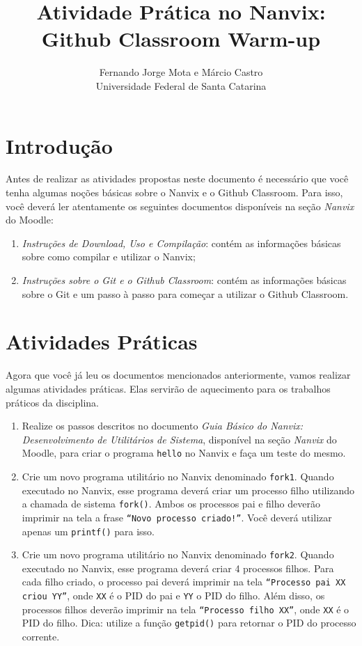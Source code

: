 \documentclass[11pt]{article}
\title{Atividade Prática no Nanvix: Github Classroom Warm-up}
\author{Fernando Jorge Mota e Márcio Castro\\[0.3em]
\small Universidade Federal de Santa Catarina}
\date{}
\begin{document}
\maketitle

\section{Introdução}

Antes de realizar as atividades propostas neste documento é necessário que você tenha algumas noções básicas sobre o Nanvix e o Github Classroom. Para isso, você deverá ler atentamente os seguintes documentos disponíveis na seção \textit{Nanvix} do Moodle:

\begin{enumerate}
	\item \textit{Instruções de Download, Uso e Compilação}: contém as informações básicas sobre como compilar e utilizar o Nanvix;
	\item \textit{Instruções sobre o Git e o Github Classroom}: contém as informações básicas sobre o Git e um passo à passo para começar a utilizar o Github Classroom.
\end{enumerate}

\section{Atividades Práticas}

Agora que você já leu os documentos mencionados anteriormente, vamos realizar algumas atividades práticas. Elas servirão de aquecimento para os trabalhos práticos da disciplina.

\begin{enumerate}
	\item Realize os passos descritos no documento \textit{Guia Básico do Nanvix: Desenvolvimento de Utilitários de Sistema}, disponível na seção \textit{Nanvix} do Moodle, para criar o programa \texttt{hello} no Nanvix e faça um teste do mesmo.
	\item Crie um novo programa utilitário no Nanvix denominado \texttt{fork1}. Quando executado no Nanvix, esse programa deverá criar um processo filho utilizando a chamada de sistema \texttt{fork()}. Ambos os processos pai e filho deverão imprimir na tela a frase \texttt{``Novo processo criado!''}. Você deverá utilizar apenas um \texttt{printf()} para isso.
	\item Crie um novo programa utilitário no Nanvix denominado \texttt{fork2}. Quando executado no Nanvix, esse programa deverá criar 4 processos filhos. Para cada filho criado, o processo pai deverá imprimir na tela \texttt{``Processo pai XX criou YY''}, onde \texttt{XX} é o PID do pai e \texttt{YY} o PID do filho. Além disso, os processos filhos deverão imprimir na tela \texttt{``Processo filho XX''}, onde \texttt{XX} é o PID do filho. Dica: utilize a função \texttt{getpid()} para retornar o PID do processo corrente.
\end{enumerate}
\end{document}
